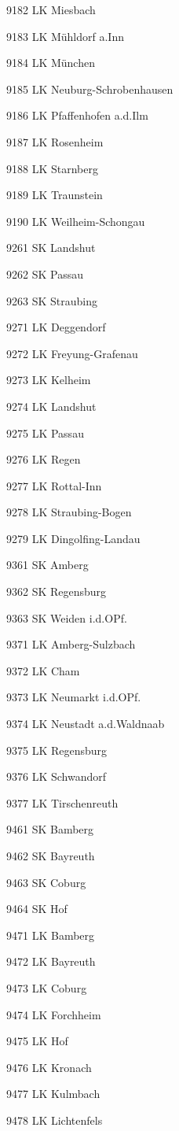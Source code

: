 9182  LK Miesbach

9183  LK Mühldorf a.Inn

9184  LK München

9185  LK Neuburg-Schrobenhausen

9186  LK Pfaffenhofen a.d.Ilm

9187  LK Rosenheim

9188  LK Starnberg

9189  LK Traunstein

9190  LK Weilheim-Schongau

9261  SK Landshut

9262  SK Passau

9263  SK Straubing

9271  LK Deggendorf

9272  LK Freyung-Grafenau

9273  LK Kelheim

9274  LK Landshut

9275  LK Passau

9276  LK Regen

9277  LK Rottal-Inn

9278  LK Straubing-Bogen

9279  LK Dingolfing-Landau

9361  SK Amberg

9362  SK Regensburg

9363  SK Weiden i.d.OPf.

9371  LK Amberg-Sulzbach

9372  LK Cham

9373  LK Neumarkt i.d.OPf.

9374  LK Neustadt a.d.Waldnaab

9375  LK Regensburg

9376  LK Schwandorf

9377  LK Tirschenreuth

9461  SK Bamberg

9462  SK Bayreuth

9463  SK Coburg

9464  SK Hof

9471  LK Bamberg

9472  LK Bayreuth

9473  LK Coburg

9474  LK Forchheim

9475  LK Hof

9476  LK Kronach

9477  LK Kulmbach

9478  LK Lichtenfels

